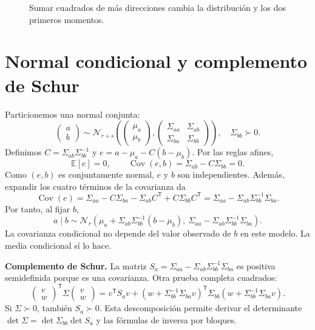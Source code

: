 \documentclass[11pt,a4paper]{article}
\newcommand{\E}{\mathbb E}
\newcommand{\T}{^{\mathsf T}}
\DeclareMathOperator{\Cov}{Cov}
\newcommand{\Normal}{\mathcal N}
\newcommand{\topic}[2]{\clearpage\section{#1}\label{#2}}
\theoremstyle{definition}\newtheorem{definicion}[teorema]{Definición}
\begin{document}
\begin{figure}[H]\centering
{}
\caption{Sumar cuadrados de más direcciones cambia la distribución y los dos primeros momentos.}
\end{figure}
\topic{Normal condicional y complemento de Schur}{s21}
Particionemos una normal conjunta:
\[
\begin{pmatrix}a\\b\end{pmatrix}
\sim\Normal_{r+s}\!\left(
\begin{pmatrix}\mu_a\\\mu_b\end{pmatrix},
\begin{pmatrix}\Sigma_{aa}&\Sigma_{ab}\\
\Sigma_{ba}&\Sigma_{bb}\end{pmatrix}\right),
\quad \Sigma_{bb}\succ0.
\]
Definimos $C=\Sigma_{ab}\Sigma_{bb}^{-1}$ y
$e=a-\mu_a-C(b-\mu_b)$. Por las reglas afines,
\[
\E[e]=0,\qquad
\Cov(e,b)=\Sigma_{ab}-C\Sigma_{bb}=0.
\]
Como $(e,b)$ es conjuntamente normal, $e$ y $b$ son independientes.
Además, expandir los cuatro términos de la covarianza da
\[
\Cov(e)=\Sigma_{aa}-C\Sigma_{ba}-\Sigma_{ab}C\T
+C\Sigma_{bb}C\T
=\Sigma_{aa}-\Sigma_{ab}\Sigma_{bb}^{-1}\Sigma_{ba}.
\]
Por tanto, al fijar $b$,
\[
\boxed{
a\mid b\sim\Normal_r\!\left(
\mu_a+\Sigma_{ab}\Sigma_{bb}^{-1}(b-\mu_b),
\ \Sigma_{aa}-\Sigma_{ab}\Sigma_{bb}^{-1}\Sigma_{ba}
\right)}.
\]
La covarianza condicional no depende del valor observado de $b$ en este
modelo. La media condicional sí lo hace.

\textbf{Complemento de Schur.} La matriz
$S_a=\Sigma_{aa}-\Sigma_{ab}\Sigma_{bb}^{-1}\Sigma_{ba}$
es positiva semidefinida porque es una covarianza.
Otra prueba completa cuadrados:
\[
\begin{pmatrix}v\\w\end{pmatrix}\T\Sigma
\begin{pmatrix}v\\w\end{pmatrix}
=v\T S_av+
(w+\Sigma_{bb}^{-1}\Sigma_{ba}v)\T
\Sigma_{bb}(w+\Sigma_{bb}^{-1}\Sigma_{ba}v).
\]
Si $\Sigma\succ0$, también $S_a\succ0$. Esta descomposición permite
derivar el determinante
$\det\Sigma=\det\Sigma_{bb}\det S_a$ y las fórmulas de inversa por bloques.
\end{document}
